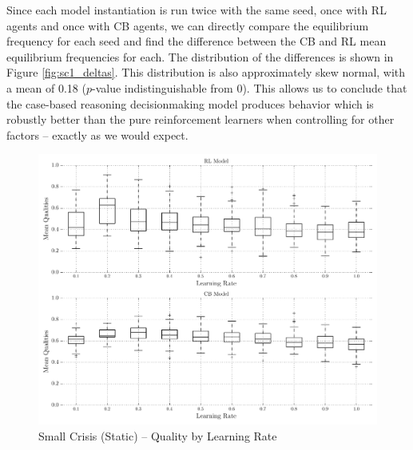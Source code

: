 Since each model instantiation is run twice with the same seed, once with RL agents and once with CB agents, we can directly compare the equilibrium frequency for each seed and find the difference between the CB and RL mean equilibrium frequencies for each. The distribution of the differences is shown in Figure \ref{fig:sc1_deltas}. This distribution is also approximately skew normal, with a mean of 0.18 ($p$-value indistinguishable from 0). This allows us to conclude that the case-based reasoning decisionmaking model produces behavior which is robustly better than the pure reinforcement learners when controlling for other factors -- exactly as we would expect.

\begin{figure}[h!]
	\includegraphics[width=\textwidth]{WarReason/Figures/SC_1_boxwhiskers}
    \caption{Small Crisis (Static) -- Quality by Learning Rate}
    \label{fig:sc1_boxwhiskers}
    \figSpace
\end{figure}

